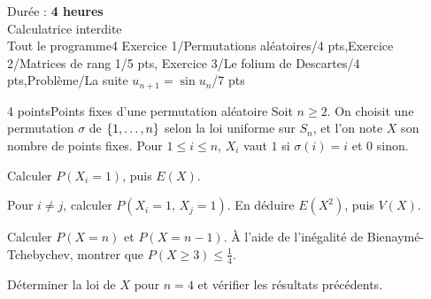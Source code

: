 
  {Durée : \textbf{4 heures}\\Calculatrice interdite\\Tout le programme}{4}
  {Exercice 1/Permutations aléatoires/4 pts,Exercice 2/Matrices de rang 1/5 pts,%
   Exercice 3/Le folium de Descartes/4 pts,Problème/La suite $u_{n+1}=\sin u_n$/7 pts}

\begin{exoEval}{4 points}{Points fixes d'une permutation aléatoire}
Soit $n\geqslant2$. On choisit une permutation $\sigma$ de
$\left\{1,\dots,n\right\}$ selon la loi uniforme sur $S_n$, et l'on note $X$ son
nombre de points fixes. Pour $1\leqslant i\leqslant n$, $X_i$ vaut $1$ si
$\sigma(i)=i$ et $0$ sinon.
\begin{questions}
  \item Calculer $P(X_i=1)$, puis $E(X)$.
  \item Pour $i\neq j$, calculer $P(X_i=1,\,X_j=1)$. En déduire $E(X^{2})$,
    puis $V(X)$.
  \item Calculer $P(X=n)$ et $P(X=n-1)$. À l'aide de l'inégalité de
    Bienaymé-Tchebychev, montrer que $P(X\geqslant3)\leqslant\frac14$.
  \item Déterminer la loi de $X$ pour $n=4$ et vérifier les résultats
    précédents.
\end{questions}
\end{exoEval}

